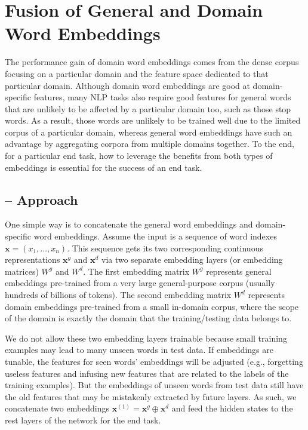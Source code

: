 \section{Fusion of General and Domain Word Embeddings}
\label{chap3:sec:double}
The performance gain of domain word embeddings comes from the dense corpus focusing on a particular domain and the feature space dedicated to that particular domain. 
Although domain word embeddings are good at domain-specific features, many NLP tasks also require good features for general words that are unlikely to be affected by a particular domain too, such as those stop words.
As a result, those words are unlikely to be trained well due to the limited corpus of a particular domain, whereas general word embeddings have such an advantage by aggregating corpora from multiple domains together.
To the end, for a particular end task, how to leverage the benefits from both types of embeddings is essential for the success of an end task.  

\subsection{-- Approach}

One simple way is to concatenate the general word embeddings and domain-specific word embeddings.
Assume the input is a sequence of word indexes $\mathbf{x}=(x_1, \dots, x_n)$.
This sequence gets its two corresponding continuous representations $\mathbf{x}^g$ and $\mathbf{x}^d$ via two separate embedding layers (or embedding matrices) $W^g$ and $W^d$.
The first embedding matrix $W^g$ represents general embeddings pre-trained from a very large general-purpose corpus (usually hundreds of billions of tokens).
The second embedding matrix $W^d$ represents domain embeddings pre-trained from a small in-domain corpus, where the scope of the domain is exactly the domain that the training/testing data belongs to.

We do not allow these two embedding layers trainable because small training examples may lead to many unseen words in test data.
If embeddings are tunable, the features for seen words' embeddings will be adjusted (e.g., forgetting useless features and infusing new features that are related to the labels of the training examples).
But the embeddings of unseen words from test data still have the old features that may be mistakenly extracted by future layers.
As such, we concatenate two embeddings $\mathbf{x}^{(1)}=\mathbf{x}^g \oplus \mathbf{x}^d$ and feed the hidden states to the rest layers of the network for the end task.

